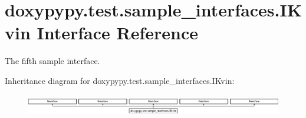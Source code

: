 \hypertarget{classdoxypypy_1_1test_1_1sample__interfaces_1_1_i_kvin}{\section{doxypypy.\-test.\-sample\-\_\-interfaces.\-I\-Kvin Interface Reference}
\label{classdoxypypy_1_1test_1_1sample__interfaces_1_1_i_kvin}
}


The fifth sample interface.  


Inheritance diagram for doxypypy.\-test.\-sample\-\_\-interfaces.\-I\-Kvin\-:\begin{figure}[H]
\begin{center}
\leavevmode
\includegraphics[height=0.949153cm]{classdoxypypy_1_1test_1_1sample__interfaces_1_1_i_kvin}
\end{center}
\end{figure}
